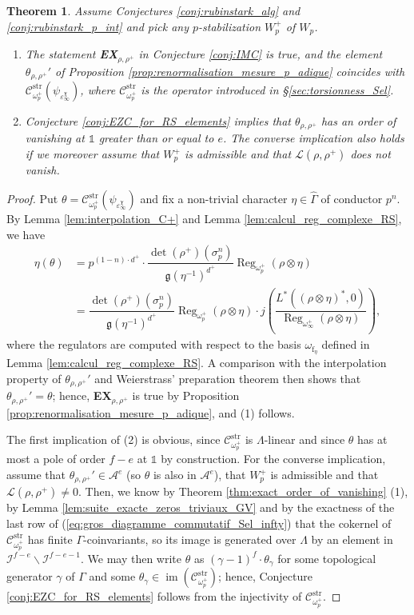 \documentclass[12pt]{amsart}
\newcommand\cA{\mathcal{A}}
\newcommand\cI{\mathcal{I}}
\newcommand\cL{\mathcal{L}}
\newcommand\g{\mathfrak{g}}
\newcommand\sC{\mathscr{C}}
\newcommand{\str}{\mathrm{str}}
\DeclareMathOperator{\im}{im}
\DeclareMathOperator{\Reg}{Reg}
\newcommand{\ff}{\mathrm{f}}
\theoremstyle{defstyle}
\theoremstyle{thmstyle}
\newtheorem{theorem}[subsubsection]{Theorem}
\begin{document}
\begin{theorem}\label{thm:comparaison_mesure_p_adique_RS_elts}
	Assume Conjectures \ref{conj:rubinstark_alg} and \ref{conj:rubinstark_p_int} and pick any $p$-stabilization $W_p^+$ of $W_p$.
	 \begin{enumerate}
		\item The statement \textbf{EX}$_{\rho,\rho^+}$ in Conjecture \ref{conj:IMC} is true, and the element $\theta_{\rho,\rho^+}'$ of Proposition \ref{prop:renormalisation_mesure_p_adique} coincides with $\sC^\str_{\omega_p^+}(\psi_{\varepsilon_\infty^\chi})$, where $\sC_{\omega_p^+}^\str$ is the operator introduced in \S\ref{sec:torsionness_Sel}.
		\item Conjecture \ref{conj:EZC_for_RS_elements} implies that $\theta_{\rho,\rho^+}$ has an order of vanishing at $\mathds{1}$ greater than or equal to $e$. The converse implication also holds if we moreover assume that $W_p^+$ is admissible and that $\cL(\rho,\rho^+)$ does not vanish.
	\end{enumerate}
\end{theorem}
\begin{proof}
    Put $\theta=\sC^\str_{\omega_p^+}(\psi_{\varepsilon_\infty^\chi})$ and fix a non-trivial character $\eta\in\widehat{\Gamma}$ of conductor $p^n$. By Lemma \ref{lem:interpolation_C+} and Lemma \ref{lem:calcul_reg_complexe_RS}, we have 
    \begin{align*}
    \eta(\theta) &= p^{(1-n)\cdot d^+}\cdot\dfrac{\det(\rho^+)(\sigma_p^n)}{\g(\eta^{-1})^{d^+}}\Reg_{\omega_p^+}(\rho\otimes\eta)\\
    &=\dfrac{\det(\rho^+)(\sigma_p^n)}{\g(\eta^{-1})^{d^+}} \Reg_{\omega_p^+}(\rho\otimes\eta)\cdot j\left(\dfrac{L^*((\rho\otimes\eta)^*,0)}{\Reg_{\omega_\infty^+}(\rho\otimes\eta)}\right),
    \end{align*}
    where the regulators are computed with respect to the basis $\omega_{\ff_\eta}$ defined in Lemma \ref{lem:calcul_reg_complexe_RS}. A comparison with the interpolation property of $\theta_{\rho,\rho^+}'$ and Weierstrass' preparation theorem then shows that $\theta_{\rho,\rho^+}'=\theta$; hence, \textbf{EX}$_{\rho,\rho^+}$ is true by Proposition \ref{prop:renormalisation_mesure_p_adique}, and (1) follows. 
    
    The first implication of (2) is obvious, since $\sC^\str_{\omega_p^+}$ is $\Lambda$-linear and since $\theta$ has at most a pole of order $f-e$ at $\mathds{1}$ by construction. For the converse implication, assume that $\theta_{\rho,\rho^+}'\in\cA^e$ (so $\theta$ is also in $\cA^e$), that $W_p^+$ is admissible and that $\cL(\rho,\rho^+)\neq 0$. Then, we know by Theorem \ref{thm:exact_order_of_vanishing} (1), by Lemma \ref{lem:suite_exacte_zeros_triviaux_GV} and by the exactness of the last row of (\ref{eq:gros_diagramme_commutatif_Sel_infty}) that the cokernel of $\sC^\str_{\omega_p^+}$ has finite $\Gamma$-coinvariants, so its image is generated over $\Lambda$ by an element in $\cI^{f-e}\backslash\cI^{f-e-1}$. We may then write $\theta$ as $(\gamma-1)^f\cdot \theta_\gamma$ for some topological generator $\gamma$ of $\Gamma$ and some $\theta_\gamma\in \im(\sC^\str_{\omega_p^+})$; hence, Conjecture \ref{conj:EZC_for_RS_elements} follows from the injectivity of $\sC^\str_{\omega_p^+}$.
\end{proof}
\end{document}
